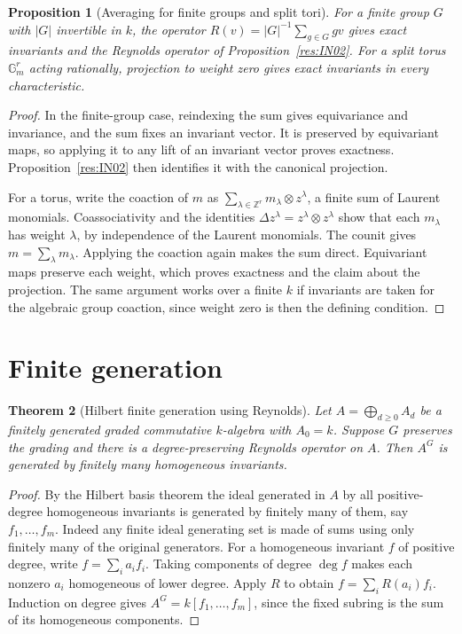 \documentclass[11pt,oneside,openany]{book}
\newtheorem{theorem}{Theorem}[chapter]
\newtheorem{proposition}[theorem]{Proposition}
\theoremstyle{definition}
\theoremstyle{remark}
\begin{document}
\begin{proposition}[Averaging for finite groups and split tori]
\label{res:IN03}
For a finite group \(G\) with \(|G|\) invertible in \(k\), the
operator \(R(v)=|G|^{-1}\sum_{g\in G}gv\) gives exact invariants
and the Reynolds operator of Proposition~\ref{res:IN02}.
For a split torus \(\mathbb G_m^r\) acting rationally, projection
to weight zero gives exact invariants in every characteristic.
\end{proposition}
\begin{proof}
In the finite-group case, reindexing the sum gives equivariance
and invariance, and the sum fixes an invariant vector. It is
preserved by equivariant maps, so applying it to any lift of an
invariant vector proves exactness. Proposition~\ref{res:IN02}
then identifies it with the canonical projection.

For a torus, write the coaction of \(m\) as
\(\sum_{\lambda\in\mathbb Z^r}m_\lambda\otimes z^\lambda\),
a finite sum of Laurent monomials. Coassociativity and the
identities
\(\Delta z^\lambda=z^\lambda\otimes z^\lambda\) show that
each \(m_\lambda\) has weight \(\lambda\), by independence of
the Laurent monomials. The counit gives \(m=\sum_\lambda m_\lambda\).
Applying the coaction again makes the sum direct. Equivariant
maps preserve each weight, which proves exactness and the
claim about the projection. The same argument works over a
finite \(k\) if invariants are taken for the algebraic group
coaction, since weight zero is then the defining condition.
\end{proof}

\section{Finite generation}

\begin{theorem}[Hilbert finite generation using Reynolds]
\label{res:IN04}
Let \(A=\bigoplus_{d\ge0} A_d\) be a finitely generated
graded commutative \(k\)-algebra with \(A_0=k\).
Suppose \(G\) preserves the grading and there is a
degree-preserving Reynolds operator on \(A\). Then \(A^G\)
is generated by finitely many homogeneous invariants.
\end{theorem}
\begin{proof}
By the Hilbert basis theorem the ideal generated in \(A\)
by all positive-degree homogeneous invariants is generated by
finitely many of them, say \(f_1,\ldots,f_m\). Indeed any
finite ideal generating set is made of sums using only
finitely many of the original generators. For a homogeneous
invariant \(f\) of positive degree, write \(f=\sum_i a_i f_i\).
Taking components of degree \(\deg f\) makes each nonzero
\(a_i\) homogeneous of lower degree. Apply \(R\) to obtain
\(f=\sum_i R(a_i)f_i\). Induction on degree gives
\(A^G=k[f_1,\ldots,f_m]\), since the fixed subring is the sum
of its homogeneous components.
\end{proof}
\end{document}
